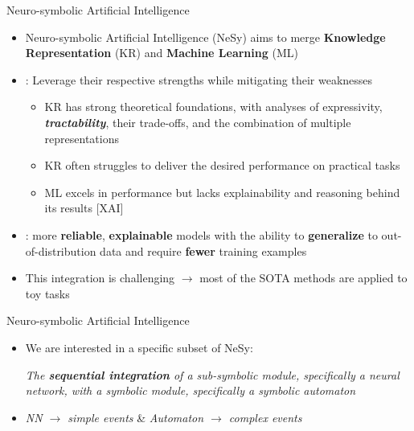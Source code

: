 \documentclass[10pt, aspectratio=169]{beamer}
\begin{document}
\begin{frame}{Neuro-symbolic Artificial Intelligence}
    \begin{itemize}
        \setlength{\itemsep}{12pt}
        \item Neuro-symbolic Artificial Intelligence (NeSy) aims to merge \textbf{Knowledge Representation} (KR) and \textbf{Machine Learning} (ML)
        \item {}: Leverage their respective strengths while mitigating their weaknesses
        \vspace{0.6em}
        \begin{itemize}
            \setlength{\itemsep}{4pt}
                \item KR has \textcolor{green!70!black}{strong theoretical foundations}, with analyses of expressivity, \textbf{\textit{tractability}}, their trade-offs, and the combination of multiple representations
                \item KR often struggles to deliver the desired  \textcolor{red!90!black}{performance} on practical tasks
                \item ML excels in \textcolor{green!70!black}{performance} but lacks \textcolor{red!90!black}{explainability} and reasoning behind its results [XAI]
            \end{itemize}
        \item {}: more \textbf{reliable}, \textbf{explainable} models with the ability to \textbf{generalize} to out-of-distribution data and require \textbf{fewer} training examples
        \item This integration is challenging $\rightarrow$ most of the SOTA methods are applied to toy tasks
    \end{itemize}
\end{frame}

\begin{frame}{Neuro-symbolic Artificial Intelligence}
    \begin{itemize}
        \setlength{\itemsep}{12pt}
        \item We are interested in a specific subset of NeSy:
        \vspace{1em}
        \begin{center}
            \textit{The \textbf{sequential integration} of a sub-symbolic module, specifically a neural network, with a symbolic module, specifically a symbolic automaton}
        \end{center}
        \item {} \textit{NN $\rightarrow$ simple events} \&  \textit{Automaton $\rightarrow$ complex events}
    \end{itemize}
\end{frame}
\end{document}
